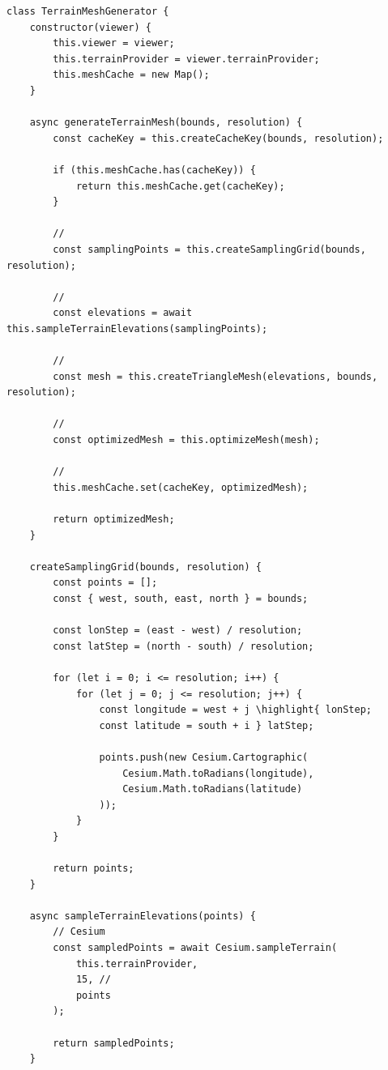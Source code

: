\begin{lstlisting}[style=javascript]
class TerrainMeshGenerator {
    constructor(viewer) {
        this.viewer = viewer;
        this.terrainProvider = viewer.terrainProvider;
        this.meshCache = new Map();
    }
    
    async generateTerrainMesh(bounds, resolution) {
        const cacheKey = this.createCacheKey(bounds, resolution);
        
        if (this.meshCache.has(cacheKey)) {
            return this.meshCache.get(cacheKey);
        }
        
        // 
        const samplingPoints = this.createSamplingGrid(bounds, resolution);
        
        // 
        const elevations = await this.sampleTerrainElevations(samplingPoints);
        
        // 
        const mesh = this.createTriangleMesh(elevations, bounds, resolution);
        
        // 
        const optimizedMesh = this.optimizeMesh(mesh);
        
        // 
        this.meshCache.set(cacheKey, optimizedMesh);
        
        return optimizedMesh;
    }
    
    createSamplingGrid(bounds, resolution) {
        const points = [];
        const { west, south, east, north } = bounds;
        
        const lonStep = (east - west) / resolution;
        const latStep = (north - south) / resolution;
        
        for (let i = 0; i <= resolution; i++) {
            for (let j = 0; j <= resolution; j++) {
                const longitude = west + j \highlight{ lonStep;
                const latitude = south + i } latStep;
                
                points.push(new Cesium.Cartographic(
                    Cesium.Math.toRadians(longitude),
                    Cesium.Math.toRadians(latitude)
                ));
            }
        }
        
        return points;
    }
    
    async sampleTerrainElevations(points) {
        // Cesium
        const sampledPoints = await Cesium.sampleTerrain(
            this.terrainProvider,
            15, // 
            points
        );
        
        return sampledPoints;
    }
    

\end{lstlisting}
